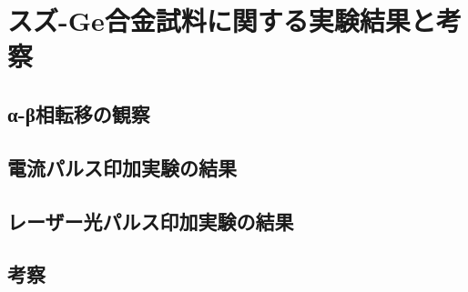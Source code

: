 \section{スズ-Ge合金試料に関する実験結果と考察}
\subsection{α-β相転移の観察}
\subsection{電流パルス印加実験の結果}
\subsection{レーザー光パルス印加実験の結果}
\subsection{考察}